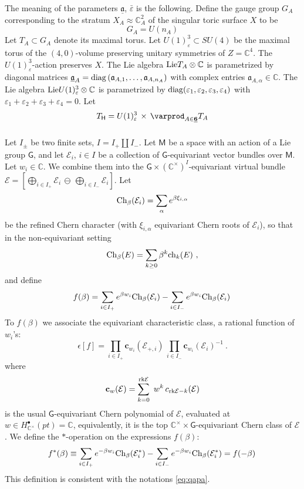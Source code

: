 \documentclass[12pt]{amsart}
\newcommand {\3}{\underline{\bf 3}}
\newcommand {\4}{\underline{\bf 4}}
\newcommand {\6}{\underline{\bf 6}}
\newcommand{\beq}{\begin{equation}}
\newcommand{\eeq}{\end{equation}}
\newcommand {\BC}   {\mathbb C}
\newcommand {\Hf} {\mathsf{H}}
\newcommand {\ba}  {\underline{\ac}}
\newcommand {\cb} {\mathbf{c}}
\newcommand {\ac} {\mathfrak{a}}
\newcommand {\CalE} {\mathcal E}
\newcommand{\ve}{\varepsilon}
\newcommand{\ep}{\epsilon}
\newcommand{\Mf}{\mathsf{M}}
\newcommand{\Gf}{\mathsf{G}}
\newcommand{\subsubsec}[1]{\subsubsection{\uwave{\sl #1}}}
\begin{document}
 The meaning of the parameters $\ba$, $\bar\ve$ is the following. Define the gauge group $G_A$ corresponding to the stratum $X_A \approx {\BC}^{2}_{A}$ of the singular toric surface $X$ to be 
\beq
G_A = U( n_A )
 \label{eq:gagr}
 \eeq
 Let $T_A \subset G_A$ denote its maximal torus. 
 Let $U(1)^3_{\ve} \subset SU(4)$ be the maximal torus of the $(4,0)$-volume preserving unitary symmetries of $Z = {\BC}^{4}$. 
 The $U(1)^3_{\ve}$-action preserves $X$. 
 The Lie algebra ${\rm Lie}T_{A} \otimes {\BC}$ is parametrized by diagonal matrices
 ${\ba}_{A} = {\rm diag} \left( {\ac}_{A, 1} , \ldots , {\ac}_{A, n_{A}} \right)$ with complex entries ${\ac}_{A, {\alpha}} \in {\BC}$. The Lie algebra ${\rm Lie}U(1)^{3}_{\ve} \otimes {\BC}$ is parametrized by ${\rm diag}({\ve}_{1}, {\ve}_{2}, {\ve}_{3}, {\ve}_{4})$ with ${\ve}_{1} + {\ve}_{2} + {\ve}_{3} + {\ve}_{4} = 0$. 
 Let
\beq
T_{\Hf} = U(1)^{3}_{\ve} \, \times \,  \varprod_{A \in {\6}} T_{A} 
\eeq 


\subsubsec{Additive to multiplicative}
Let $I_{\pm}$ be two finite sets, $I = I_{+} \amalg I_{-}$. 
Let ${\Mf}$ be a space with an action of a Lie group $\Gf$, and 
let ${\CalE}_{i}$, $i \in I$ be a collection of $\Gf$-equivariant vector bundles over
$\Mf$. Let $w_{i} \in {\BC}$.  We combine them into the ${\Gf} \times \left( {\BC}^{\times} \right)^{I}$-equivariant
virtual bundle ${\CalE} = \left[ \bigoplus_{i \in I_{+}} {\CalE}_{i} \, \ominus\,
\bigoplus_{i \in I_{-}} {\CalE}_{i} \right]$. Let 
\beq
{\rm Ch}_{\beta}({\CalE}_{i}) = \sum_{\alpha} e^{{\beta}{\xi}_{i,\alpha}}
\eeq
be the refined Chern character (with $\xi_{i,\alpha}$ equivariant Chern roots of $\CalE_{i}$),
so that in the non-equivariant setting 
\[ {\rm Ch}_{\beta}(E) = \sum_{k \geq 0} {\beta}^{k} {\rm ch}_{k}(E) \ , \]
and define 
\beq
f ({\beta}) = \sum_{i \in I_{+}} e^{{\beta}w_{i}} {\rm Ch}_{\beta}({\CalE}_{i}) -  \sum_{i \in I_{-}} e^{{\beta}w_{i}} {\rm Ch}_{\beta}({\CalE}_{i}) \, 
\label{eq:fb2}
\eeq
To $f({\beta})$ we associate the equivariant characteristic class, a rational function of $w_{i}$'s:
\beq
{\ep} [f] =  \prod_{i \in I_{+}} {\cb}_{w_{i}}({\CalE}_{+,i}) \, \prod_{i \in I_{-}} {\cb}_{w_{i}}({\CalE}_{i})^{-1}\  . 
\label{eq:epf2} 
\eeq
where
\beq
{\cb}_{w}({\CalE}) = \sum_{k=0}^{{\rm rk}{\CalE}} \
w^{k}\, c_{{\rm rk}{\CalE} - k} ({\CalE})
\eeq
is the usual $\Gf$-equivariant Chern polynomial of $\CalE$, evaluated at $w \in H^{\bullet}_{{\BC}^{\times}}(pt) = {\BC}$, equivalently, it is the top ${\BC}^{\times} \times {\Gf}$-equivariant Chern class of $\CalE$.  
We define the $*$-operation on the expressions $f({\beta})$: 
\beq
f^{*} ({\beta}) \equiv \sum_{i \in I_{+}} e^{-{\beta}w_{i}} {\rm Ch}_{\beta}({\CalE}_{i}^{*}) -  \sum_{i \in I_{-}} e^{-{\beta}w_{i}} {\rm Ch}_{\beta}({\CalE}_{i}^{*})  = f(-{\beta})\, 
\label{eq:fb3}
\eeq
This definition is consistent with the notations \eqref{eq:qapa}. 
\end{document}
